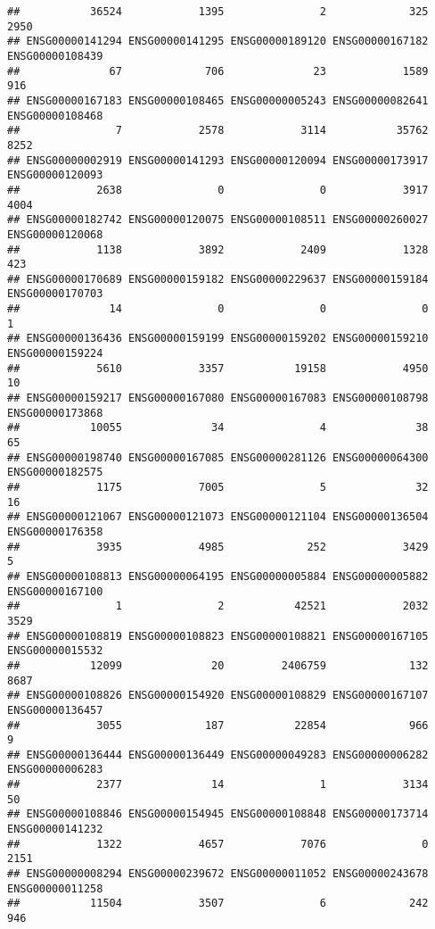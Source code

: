 \documentclass[
]{article}
\begin{document}
\begin{verbatim}
##           36524            1395               2             325            2950 
## ENSG00000141294 ENSG00000141295 ENSG00000189120 ENSG00000167182 ENSG00000108439 
##              67             706              23            1589             916 
## ENSG00000167183 ENSG00000108465 ENSG00000005243 ENSG00000082641 ENSG00000108468 
##               7            2578            3114           35762            8252 
## ENSG00000002919 ENSG00000141293 ENSG00000120094 ENSG00000173917 ENSG00000120093 
##            2638               0               0            3917            4004 
## ENSG00000182742 ENSG00000120075 ENSG00000108511 ENSG00000260027 ENSG00000120068 
##            1138            3892            2409            1328             423 
## ENSG00000170689 ENSG00000159182 ENSG00000229637 ENSG00000159184 ENSG00000170703 
##              14               0               0               0               1 
## ENSG00000136436 ENSG00000159199 ENSG00000159202 ENSG00000159210 ENSG00000159224 
##            5610            3357           19158            4950              10 
## ENSG00000159217 ENSG00000167080 ENSG00000167083 ENSG00000108798 ENSG00000173868 
##           10055              34               4              38              65 
## ENSG00000198740 ENSG00000167085 ENSG00000281126 ENSG00000064300 ENSG00000182575 
##            1175            7005               5              32              16 
## ENSG00000121067 ENSG00000121073 ENSG00000121104 ENSG00000136504 ENSG00000176358 
##            3935            4985             252            3429               5 
## ENSG00000108813 ENSG00000064195 ENSG00000005884 ENSG00000005882 ENSG00000167100 
##               1               2           42521            2032            3529 
## ENSG00000108819 ENSG00000108823 ENSG00000108821 ENSG00000167105 ENSG00000015532 
##           12099              20         2406759             132            8687 
## ENSG00000108826 ENSG00000154920 ENSG00000108829 ENSG00000167107 ENSG00000136457 
##            3055             187           22854             966               9 
## ENSG00000136444 ENSG00000136449 ENSG00000049283 ENSG00000006282 ENSG00000006283 
##            2377              14               1            3134              50 
## ENSG00000108846 ENSG00000154945 ENSG00000108848 ENSG00000173714 ENSG00000141232 
##            1322            4657            7076               0            2151 
## ENSG00000008294 ENSG00000239672 ENSG00000011052 ENSG00000243678 ENSG00000011258 
##           11504            3507               6             242             946 

\end{verbatim}
\end{document}
